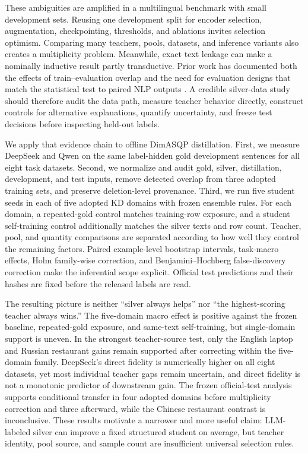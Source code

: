 These ambiguities are amplified in a multilingual benchmark with small
development sets. Reusing one development split for encoder selection,
augmentation, checkpointing, thresholds, and ablations invites selection
optimism. Comparing many teachers, pools, datasets, and inference
variants also creates a multiplicity problem. Meanwhile, exact text
leakage can make a nominally inductive result partly transductive. Prior
work has documented both the effects of train--evaluation overlap and
the need for evaluation designs that match the statistical test to
paired NLP outputs \citep{lee2022deduplicating,dror2018hitchhiker}. A
credible silver-data study should therefore audit the data path, measure
teacher behavior directly, construct controls for alternative
explanations, quantify uncertainty, and freeze test decisions before
inspecting held-out labels.

We apply that evidence chain to offline DimASQP distillation. First, we
measure DeepSeek and Qwen on the same label-hidden gold development
sentences for all eight task datasets. Second, we normalize and audit
gold, silver, distillation, development, and test inputs, remove
detected overlap from three adopted training sets, and preserve
deletion-level provenance. Third, we run five student seeds in each of
five adopted KD domains with frozen ensemble rules. For each domain, a
repeated-gold control matches training-row exposure, and a student
self-training control additionally matches the silver texts and row
count. Teacher, pool, and quantity comparisons are separated according
to how well they control the remaining factors. Paired example-level
bootstrap intervals, task-macro effects, Holm family-wise correction,
and Benjamini--Hochberg false-discovery correction make the inferential
scope explicit. Official test predictions and their hashes are fixed
before the released labels are read.

The resulting picture is neither ``silver always helps'' nor ``the
highest-scoring teacher always wins.'' The five-domain macro effect is
positive against the frozen baseline, repeated-gold exposure, and
same-text self-training, but single-domain support is uneven. In the
strongest teacher-source test, only the English laptop and Russian
restaurant gains remain supported after correcting within the
five-domain family. DeepSeek's direct fidelity is numerically higher on
all eight datasets, yet most individual teacher gaps remain uncertain,
and direct fidelity is not a monotonic predictor of downstream gain. The
frozen official-test analysis supports conditional transfer in four
adopted domains before multiplicity correction and three afterward,
while the Chinese restaurant contrast is inconclusive. These results
motivate a narrower and more useful claim: LLM-labeled silver can
improve a fixed structured student on average, but teacher identity,
pool source, and sample count are insufficient universal selection
rules.

